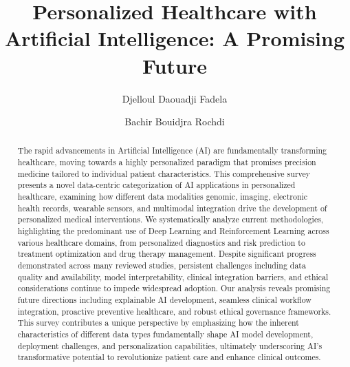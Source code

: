 \documentclass[runningheads]{llncs}
\title{Personalized Healthcare with Artificial Intelligence: A Promising Future}
\author{Djelloul Daouadji Fadela \and Bachir Bouidjra Rochdi}
\institute{Department of Computer Science, University Mascara, Mascara, Algeria \\
\email{djellouldaouadji.f@univ-mascara.dz}
}
\begin{document}
\maketitle

\begin{abstract}
The rapid advancements in Artificial Intelligence (AI) are fundamentally transforming healthcare, moving towards a highly personalized paradigm that promises precision medicine tailored to individual patient characteristics. This comprehensive survey presents a novel data-centric categorization of AI applications in personalized healthcare, examining how different data modalities genomic, imaging, electronic health records, wearable sensors, and multimodal integration drive the development of personalized medical interventions. We systematically analyze current methodologies, highlighting the predominant use of Deep Learning and Reinforcement Learning across various healthcare domains, from personalized diagnostics and risk prediction to treatment optimization and drug therapy management. Despite significant progress demonstrated across many reviewed studies, persistent challenges including data quality and availability, model interpretability, clinical integration barriers, and ethical considerations continue to impede widespread adoption. Our analysis reveals promising future directions including explainable AI development, seamless clinical workflow integration, proactive preventive healthcare, and robust ethical governance frameworks. This survey contributes a unique perspective by emphasizing how the inherent characteristics of different data types fundamentally shape AI model development, deployment challenges, and personalization capabilities, ultimately underscoring AI's transformative potential to revolutionize patient care and enhance clinical outcomes.
\end{abstract}

\end{document}
